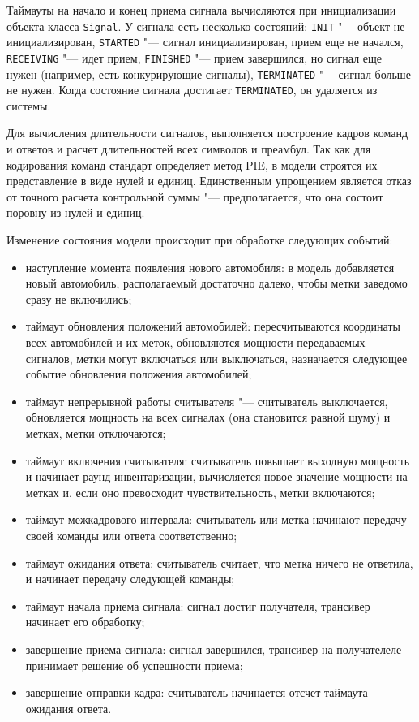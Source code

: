 Таймауты на начало и конец приема сигнала вычисляются при инициализации объекта класса \texttt{Signal}. У сигнала есть несколько состояний: \texttt{INIT} "--- объект не инициализирован, \texttt{STARTED} "--- сигнал инициализирован, прием еще не начался, \texttt{RECEIVING} "--- идет прием, \texttt{FINISHED} "--- прием завершился, но сигнал еще нужен (например, есть конкурирующие сигналы), \texttt{TERMINATED} "--- сигнал больше не нужен. Когда состояние сигнала достигает \texttt{TERMINATED}, он удаляется из системы.

Для вычисления длительности сигналов, выполняется построение кадров команд и ответов и расчет длительностей всех символов и преамбул. Так как для кодирования команд стандарт определяет метод PIE, в модели строятся их представление в виде нулей и единиц. Единственным упрощением является отказ от точного расчета контрольной суммы "--- предполагается, что она состоит поровну из нулей и единиц. 

Изменение состояния модели происходит при обработке следующих событий:

\begin{itemize}
	\item наступление момента появления нового автомобиля: в модель добавляется новый автомобиль, располагаемый достаточно далеко, чтобы метки заведомо сразу не включились;
	\item таймаут обновления положений автомобилей: пересчитываются координаты всех автомобилей и их меток, обновляются мощности передаваемых сигналов, метки могут включаться или выключаться, назначается следующее событие обновления положения автомобилей;
	\item таймаут непрерывной работы считывателя "--- считыватель выключается, обновляется мощность на всех сигналах (она становится равной шуму) и метках, метки отключаются;
	\item таймаут включения считывателя: считыватель повышает выходную мощность и начинает раунд инвентаризации, вычисляется новое значение мощности на метках и, если оно превосходит чувствительность, метки включаются;
	\item таймаут межкадрового интервала: считыватель или метка начинают передачу своей команды или ответа соответственно;
	\item таймаут ожидания ответа: считыватель считает, что метка ничего не ответила, и начинает передачу следующей команды;
	\item таймаут начала приема сигнала: сигнал достиг получателя, трансивер начинает его обработку;
	\item завершение приема сигнала: сигнал завершился, трансивер на получателеле принимает решение об успешности приема;
	\item завершение отправки кадра: считыватель начинается отсчет таймаута ожидания ответа.
\end{itemize}

